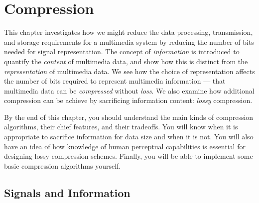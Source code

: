 
%
%
%
%

\chapter{Compression}
\label{ch:compression}

This chapter investigates how we might reduce the data processing,
transmission, and storage requirements for a multimedia system by
reducing the number of bits needed for signal representation. The
concept of \emph{information} is introduced to quantify the
\emph{content} of multimedia data, and show how this is distinct from
the \emph{representation} of multimedia data. We see how the choice of
representation affects the number of bits required to represent
multimedia information --- that multimedia data can be
\emph{compressed} without \emph{loss}.  We also examine how additional
compression can be achieve by sacrificing information content:
\emph{lossy} compression.

By the end of this chapter, you should understand the main kinds of
compression algorithms, their chief features, and their tradeoffs.
You will know when it is appropriate to sacrifice information for data
size and when it is not.  You will also have an idea of how knowledge
of human perceptual capabilities is essential for designing lossy
compression schemes. Finally, you will be able to implement some basic
compression algorithms yourself.

\section{Signals and Information}

